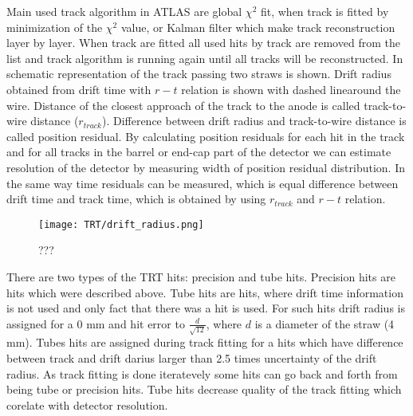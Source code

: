 Main used track algorithm in ATLAS are global $\chi^2$ fit, when track is fitted by minimization of the $\chi^2$ value, or Kalman filter which make track reconstruction
layer by layer. When track are fitted all used hits by track are removed from the list and track algorithm is running again until all tracks will be reconstructed.
In  schematic representation of the track passing two straws is shown. Drift radius obtained from drift time with $r-t$ relation is
shown with dashed linearound the wire. Distance of the closest approach of the track to the anode is called track-to-wire distance ($r_{track}$). Difference
between drift radius and track-to-wire distance is called position residual. By calculating position residuals for each hit in the track and for all
tracks in the barrel or end-cap part of the detector we can estimate resolution of the detector by measuring width of position residual distribution.
In the same way time residuals can be measured, which is equal difference between drift time and track time, which is obtained by using $r_{track}$ and 
$r-t$ relation.

\begin{figure}
\centering
\texttt{[image: TRT/drift\_radius.png]}
\caption{ 
 ???
}
\label{fig:drift_radius}
\end{figure}

There are two types of the TRT hits: precision and tube hits. Precision hits are hits which were described above. Tube hits are hits, where drift time 
information is not used and only fact that there was a hit is used. For such hits drift radius is assigned for a 0 mm and hit error to $\frac{d}{\sqrt{12}}$, where
$d$ is a diameter of the straw (4 mm). Tubes hits are assigned during track fitting for a hits which have difference between track and drift darius larger than
2.5 times uncertainty of the drift radius. As track fitting is done iteratevely some hits can go back and forth from being tube or precision hits.
Tube hits decrease quality of the track fitting which corelate with detector resolution.


